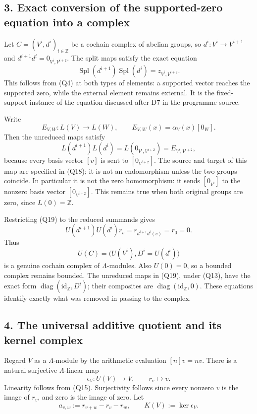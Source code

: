 \documentclass[
]{article}
\begin{document}
\subsection{3. Exact conversion of the supported-zero equation into a
complex}\label{exact-conversion-of-the-supported-zero-equation-into-a-complex}

Let \(C=(V^i,d^i)_{i\in\mathbb Z}\) be a cochain complex of abelian
groups, so \(d^i:V^i\to V^{i+1}\) and \(d^{i+1}d^i=0_{V^i,V^{i+2}}\).
The split maps satisfy the exact equation \[
\operatorname{Spl}(d^{i+1})\operatorname{Spl}(d^i)
=z_{V^i,V^{i+2}}.
\tag{Q17}
\] This follows from (Q4) at both types of elements: a supported vector
reaches the supported zero, while the external element remains external.
It is the fixed-support instance of the equation discussed after D7 in
the programme source.

Write \[
E_{V,W}:L(V)\to L(W),\qquad
E_{V,W}(x)=\alpha_V(x)[0_W].
\tag{Q18}
\] Then the unreduced maps satisfy \[
L(d^{i+1})L(d^i)=L(0_{V^i,V^{i+2}})=E_{V^i,V^{i+2}},
\tag{Q19}
\] because every basis vector \([v]\) is sent to \([0_{V^{i+2}}]\). The
source and target of this map are specified in (Q18); it is not an
endomorphism unless the two groups coincide. In particular it is not the
zero homomorphism: it sends \([0_{V^i}]\) to the nonzero basis vector
\([0_{V^{i+2}}]\). This remains true when both original groups are zero,
since \(L(0)=\mathbb Z\).

Restricting (Q19) to the reduced summands gives \[
U(d^{i+1})U(d^i)r_v=r_{d^{i+1}d^i(v)}=r_0=0.
\tag{Q20}
\] Thus \[
U(C)=\bigl(U(V^i),D^i=U(d^i)\bigr)
\tag{Q21}
\] is a genuine cochain complex of \(\Lambda\)-modules. Also \(U(0)=0\),
so a bounded complex remains bounded. The unreduced maps in (Q19), under
(Q13), have the exact form
\(\operatorname{diag}(\mathrm{id}_{\mathbb Z},D^i)\); their composites
are \(\operatorname{diag}(\mathrm{id}_{\mathbb Z},0)\). These equations
identify exactly what was removed in passing to the complex.

\subsection{4. The universal additive quotient and its kernel
complex}\label{the-universal-additive-quotient-and-its-kernel-complex}

Regard \(V\) as a \(\Lambda\)-module by the arithmetic evaluation
\([n]v=nv\). There is a natural surjective \(\Lambda\)-linear map \[
\epsilon_V:U(V)\to V,\qquad r_v\longmapsto v.
\tag{Q22}
\] Linearity follows from (Q15). Surjectivity follows since every
nonzero \(v\) is the image of \(r_v\), and zero is the image of zero.
Let \[
a_{v,w}:=r_{v+w}-r_v-r_w,
\qquad K(V):=\ker\epsilon_V.
\tag{Q23}
\]
\end{document}
